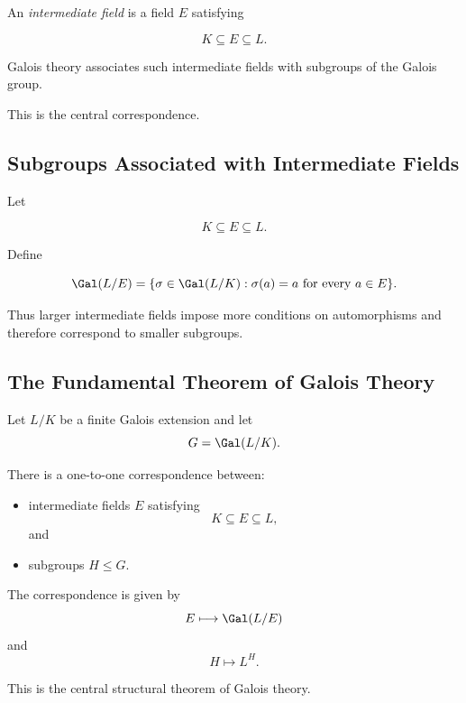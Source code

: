 An \emph{intermediate field} is a field \(E\) satisfying

\[ K\subseteq E\subseteq L. \]

Galois theory associates such intermediate fields with subgroups of the
Galois group.

This is the central correspondence.

\subsection{Subgroups Associated with Intermediate Fields}
\label{subsec:subgroups-intermediate-fields}

Let

\[ K\subseteq E\subseteq L. \]

Define

\[ \Gal(L/E)=\{\sigma\in\Gal(L/K):\sigma(a)=a\text{ for every }a\in E\}. \]

Thus larger intermediate fields impose more conditions on automorphisms and
therefore correspond to smaller subgroups.

\subsection{The Fundamental Theorem of Galois Theory}
\label{subsec:fundamental-theorem-galois}

\begin{theorem}
Let \(L/K\) be a finite Galois extension and let
\[ G=\Gal(L/K). \]

There is a one-to-one correspondence between:

\begin{itemize}
    \item intermediate fields \(E\) satisfying
    \[ K\subseteq E\subseteq L, \]
    and
    \item subgroups \(H\leq G\).
\end{itemize}

The correspondence is given by
\[ E\longmapsto\Gal(L/E) \]
and
\[ H\longmapsto L^H. \]
\end{theorem}

This is the central structural theorem of Galois theory.

